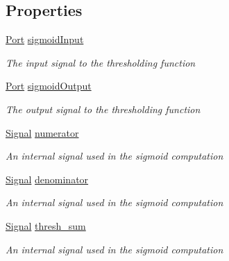 \subsection*{Properties}
\begin{DoxyCompactItemize}
\item 
\hyperlink{class_n_n_gen_1_1_port}{Port} \hyperlink{class_n_n_gen_1_1_sigmoid___poly_approx_ae6da90acd8f62414c3ead1c2cc8538da}{sigmoid\+Input}
\begin{DoxyCompactList}\small\item\em The input signal to the thresholding function \end{DoxyCompactList}\item 
\hyperlink{class_n_n_gen_1_1_port}{Port} \hyperlink{class_n_n_gen_1_1_sigmoid___poly_approx_a93bf10c040a0ed7dd4428c9df4539188}{sigmoid\+Output}
\begin{DoxyCompactList}\small\item\em The output signal to the thresholding function \end{DoxyCompactList}\item 
\hyperlink{class_n_n_gen_1_1_signal}{Signal} \hyperlink{class_n_n_gen_1_1_sigmoid___poly_approx_a14047a901c8101e599e807f4ef07d46d}{numerator}
\begin{DoxyCompactList}\small\item\em An internal signal used in the sigmoid computation \end{DoxyCompactList}\item 
\hyperlink{class_n_n_gen_1_1_signal}{Signal} \hyperlink{class_n_n_gen_1_1_sigmoid___poly_approx_a371e8a19a69ffabafa7f6e2819b3c5b6}{denominator}
\begin{DoxyCompactList}\small\item\em An internal signal used in the sigmoid computation \end{DoxyCompactList}\item 
\hyperlink{class_n_n_gen_1_1_signal}{Signal} \hyperlink{class_n_n_gen_1_1_sigmoid___poly_approx_af795af0bd003e50d11e5f3c904d03dca}{thresh\+\_\+sum}
\begin{DoxyCompactList}\small\item\em An internal signal used in the sigmoid computation \end{DoxyCompactList}\item 

\end{DoxyCompactItemize}
